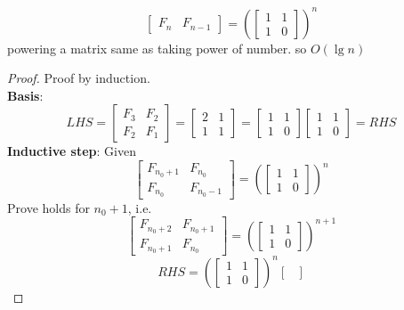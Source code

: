 \documentclass[11pt]{article}
\begin{document}
\begin{example}
\begin{solution}
\begin{enumerate}
\[\begin{bmatrix}
        F_n & F_{n-1}
      \end{bmatrix}
      =
      \left(\begin{bmatrix}
        1 & 1 \\
        1 & 0
      \end{bmatrix}\right)^n
    \]
    powering a matrix same as taking power of number. so $O(\lg n)$
    \begin{proof}
      Proof by induction. \\
      \textbf{Basis}:
      \[
        LHS = \begin{bmatrix}
        F_3 & F_2 \\
        F_2 & F_1
      \end{bmatrix} = \begin{bmatrix}
        2 & 1 \\
        1 & 1
      \end{bmatrix}
      = \begin{bmatrix}
        1 & 1 \\
        1 & 0
    \end{bmatrix} \begin{bmatrix}
      1 & 1 \\
      1 & 0
  \end{bmatrix} = RHS
      \]
      \textbf{Inductive step}: Given
      \[
        \begin{bmatrix}
          F_{n_0+1} & F_{n_0} \\
          F_{n_0} & F_{n_0-1}
        \end{bmatrix}
        =
        \left(\begin{bmatrix}
          1 & 1 \\
          1 & 0
        \end{bmatrix}\right)^n
      \]
      Prove holds for $n_0+1$, i.e.
      \[
        \begin{bmatrix}
          F_{n_0+2} & F_{n_0+1} \\
          F_{n_0 + 1} & F_{n_0}
        \end{bmatrix}
        =
        \left(\begin{bmatrix}
          1 & 1 \\
          1 & 0
        \end{bmatrix}\right)^{n+1}
      \]
      \[
        RHS = \left(\begin{bmatrix}
          1 & 1 \\
          1 & 0
        \end{bmatrix}\right)^n \begin{bmatrix}

\end{bmatrix}\]
\end{proof}
\end{enumerate}
\end{solution}
\end{example}
\end{document}
